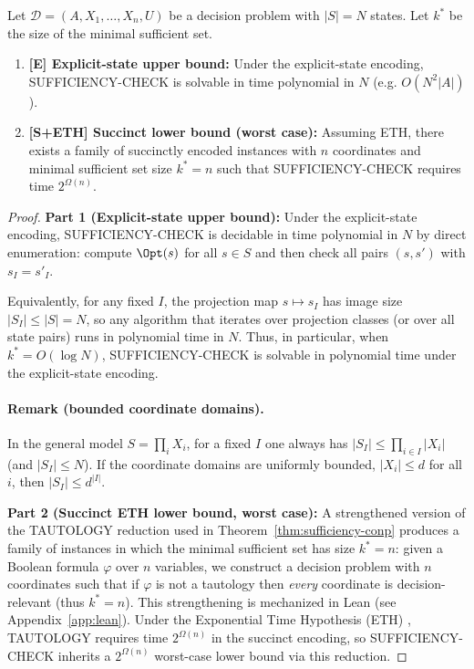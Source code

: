 \begin{theorem}\label{thm:dichotomy}
Let $\mathcal{D} = (A, X_1, \ldots, X_n, U)$ be a decision problem with $|S| = N$ states. Let $k^*$ be the size of the minimal sufficient set.

\begin{enumerate}
\item \textbf{[E] Explicit-state upper bound:} Under the explicit-state encoding, SUFFICIENCY-CHECK is solvable in time polynomial in $N$ (e.g. $O(N^2|A|)$).

\item \textbf{[S+ETH] Succinct lower bound (worst case):} Assuming ETH, there exists a family of succinctly encoded instances with $n$ coordinates and minimal sufficient set size $k^* = n$ such that SUFFICIENCY-CHECK requires time $2^{\Omega(n)}$.
\end{enumerate}
\end{theorem}

\begin{proof}
\textbf{Part 1 (Explicit-state upper bound):} Under the explicit-state encoding, SUFFICIENCY-CHECK is decidable in time polynomial in $N$ by direct enumeration: compute $\Opt(s)$ for all $s\in S$ and then check all pairs $(s,s')$ with $s_I=s'_I$.

Equivalently, for any fixed $I$, the projection map $s\mapsto s_I$ has image size $|S_I|\le |S|=N$, so any algorithm that iterates over projection classes (or over all state pairs) runs in polynomial time in $N$. Thus, in particular, when $k^*=O(\log N)$, SUFFICIENCY-CHECK is solvable in polynomial time under the explicit-state encoding.

\paragraph{Remark (bounded coordinate domains).} In the general model $S=\prod_i X_i$, for a fixed $I$ one always has $|S_I|\le \prod_{i\in I}|X_i|$ (and $|S_I|\le N$). If the coordinate domains are uniformly bounded, $|X_i|\le d$ for all $i$, then $|S_I|\le d^{|I|}$.

\textbf{Part 2 (Succinct ETH lower bound, worst case):} A strengthened version of the TAUTOLOGY reduction used in Theorem~\ref{thm:sufficiency-conp} produces a family of instances in which the minimal sufficient set has size $k^* = n$: given a Boolean formula $\varphi$ over $n$ variables, we construct a decision problem with $n$ coordinates such that if $\varphi$ is not a tautology then \emph{every} coordinate is decision-relevant (thus $k^*=n$). This strengthening is mechanized in Lean (see Appendix~\ref{app:lean}). Under the Exponential Time Hypothesis (ETH) \cite{impagliazzo2001complexity,arora2009computational}, TAUTOLOGY requires time $2^{\Omega(n)}$ in the succinct encoding, so SUFFICIENCY-CHECK inherits a $2^{\Omega(n)}$ worst-case lower bound via this reduction.
\end{proof}

